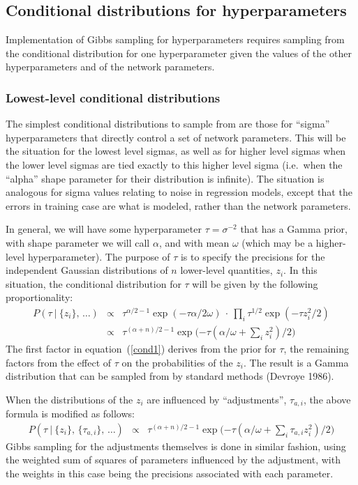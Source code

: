 \documentclass{report}[11pt]
\def\beq{\begin{eqnarray}}
\def\eeq{\end{eqnarray}}
\begin{document}
\subsection*{Conditional distributions for hyperparameters}

Implementation of Gibbs sampling for hyperparameters requires sampling
from the conditional distribution for one hyperparameter given the
values of the other hyperparameters and of the network parameters.


\subsubsection*{Lowest-level conditional distributions}

The simplest conditional distributions to sample from are those for 
``sigma'' hyperparameters that directly control a set of network
parameters.  This will be the situation for the lowest level
sigmas, as well as for higher level sigmas when the lower level sigmas
are tied exactly to this higher level sigma (i.e.\ when the ``alpha''
shape parameter for their distribution is infinite).  The situation is
analogous for sigma values relating to noise in regression models,
except that the errors in training case are what is modeled, rather
than the network parameters.

In general, we will have some hyperparameter $\tau=\sigma^{-2}$ that
has a Gamma prior, with shape parameter we will call $\alpha$, and
with mean $\omega$ (which may be a higher-level hyperparameter).  The
purpose of $\tau$ is to specify the precisions for the independent
Gaussian distributions of $n$ lower-level quantities, $z_i$.  In this
situation, the conditional distribution for $\tau$ will be given by the
following proportionality:\beq
  P(\tau\ |\ \{z_i\},\,\ldots) & \propto &
    \tau^{\alpha/2-1} \exp(-\tau\alpha/2\omega) \ \cdot\ 
    \prod_i \tau^{1/2} \exp(-\tau z_i^2/2) \label{cond1}\\[3pt]
  & \propto &
    \tau^{(\alpha+n)/2-1} 
    \exp\big({\textstyle-\tau(\alpha/\omega+\sum\limits_i z_i^2)/2}\big)
\eeq%
The first factor in equation~(\ref{cond1}) derives from the prior for $\tau$, 
the remaining factors from the effect of $\tau$ on the probabilities of the 
$z_i$.  The result is a Gamma distribution that can be sampled from by 
standard methods (Devroye 1986).

When the distributions of the $z_i$ are influenced by ``adjustments'',
$\tau_{a,i}$, the above formula is modified as follows:\beq
  P(\tau\ |\ \{z_i\},\,\{\tau_{a,i}\},\,\ldots) 
  & \propto &
    \tau^{(\alpha+n)/2-1} 
    \exp\big({\textstyle-\tau(\alpha/\omega+\sum\limits_i \tau_{a,i}z_i^2)/2}
    \big)
\eeq%
Gibbs sampling for the adjustments themselves is done in similar fashion,
using the weighted sum of squares of parameters influenced by the adjustment,
with the weights in this case being the precisions associated with each 
parameter.
\end{document}
